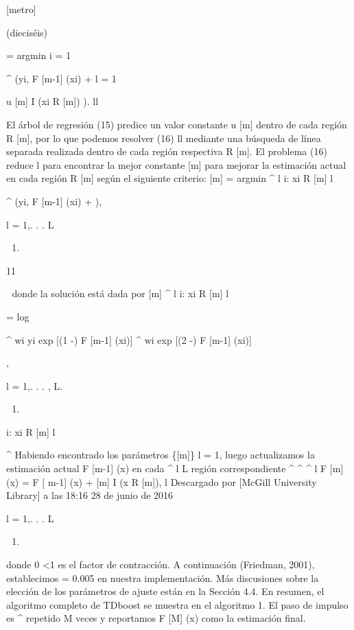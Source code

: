 \documentclass[]{article}
\begin{document}
{[}metro{]}

(dieciséis)

= argmin i = 1

\^{} (yi, F {[}m-1{]} (xi) + l = 1

u {[}m{]} I (xi R {[}m{]}) \textbar{} ). ll

El árbol de regresión (15) predice un valor constante u {[}m{]} dentro
de cada región R {[}m{]}, por lo que podemos resolver (16) ll mediante
una búsqueda de línea separada realizada dentro de cada región
respectiva R {[}m{]}. El problema (16) reduce l para encontrar la mejor
constante {[}m{]} para mejorar la estimación actual en cada región R
{[}m{]} según el siguiente criterio: {[}m{]} = argmin \^{} l i: xi R
{[}m{]} l

\^{} (yi, F {[}m-1{]} (xi) + \textbar{}),

l = 1,. . . L

\begin{enumerate}
\def\labelenumi{(\arabic{enumi})}
\setcounter{enumi}{16}
\item
\end{enumerate}

11

 donde la solución está dada por {[}m{]} \^{} l i: xi R {[}m{]} l

= log

\^{} wi yi exp {[}(1 -) F {[}m-1{]} (xi){]} \^{} wi exp {[}(2 -) F
{[}m-1{]} (xi){]}

,

l = 1,. . . , L.

\begin{enumerate}
\def\labelenumi{(\arabic{enumi})}
\setcounter{enumi}{17}
\item
\end{enumerate}

i: xi R {[}m{]} l

\^{} Habiendo encontrado los parámetros \{{[}m{]}\} l = 1, luego
actualizamos la estimación actual F {[}m-1{]} (x) en cada \^{} l L
región correspondiente \^{} \^{} \^{} l F {[}m{]} (x) = F {[} m-1{]} (x)
+ {[}m{]} I (x R {[}m{]}), l Descargado por {[}McGill University
Library{]} a las 18:16 28 de junio de 2016

l = 1,. . . L

\begin{enumerate}
\def\labelenumi{(\arabic{enumi})}
\setcounter{enumi}{18}
\item
\end{enumerate}

donde 0 \textless{}1 es el factor de contracción. A continuación
(Friedman, 2001), establecimos = 0.005 en nuestra implementación. Más
discusiones sobre la elección de los parámetros de ajuste están en la
Sección 4.4. En resumen, el algoritmo completo de TDboost se muestra en
el algoritmo 1. El paso de impulso es \^{} repetido M veces y reportamos
F {[}M{]} (x) como la estimación final.
\end{document}
